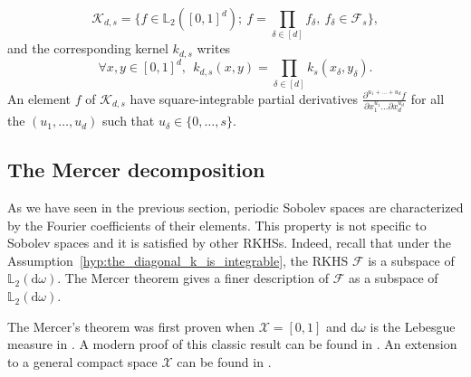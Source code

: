 \documentclass[twoside,11pt]{book}
\numberwithin{theorem}{chapter}
\numberwithin{definition}{chapter}
\numberwithin{proposition}{chapter}
\numberwithin{corollary}{chapter}
\numberwithin{example}{chapter}
\numberwithin{lemma}{chapter}
\numberwithin{assumption}{chapter}
\DeclareMathOperator{\Span}{\mathrm{Span}}
\begin{document}
\begin{equation}
\mathcal{K}_{d,s} = \{ f \in \mathbb{L}_{2}([0,1]^{d}); \: f = \prod\limits_{\delta \in [d]} f_{\delta}, \: f_{\delta} \in \mathcal{F}_{s} \},
\end{equation}
and the corresponding kernel $k_{d,s}$ writes
\begin{equation}
\forall x,y \in [0,1]^{d}, \:\: k_{d,s}(x,y) = \prod\limits_{\delta \in [d]}k_{s}(x_{\delta},y_{\delta}).
\end{equation}
An element $f$ of $\mathcal{K}_{d,s}$ have square-integrable partial derivatives $\displaystyle \frac{\partial^{u_{1}+ \dots + u_{d}}f}{\partial x_{1}^{u_{1}} \dots \partial x_{d}^{u_{d}}} $ for all the $(u_{1}, \dots,u_{d})$ such that $u_{\delta} \in \{0, \dots, s\}$.





%
 


\subsection{The Mercer decomposition}
\label{subsec:mercer}
As we have seen in the previous section, periodic Sobolev spaces are characterized by the Fourier coefficients of their elements. This property is not specific to Sobolev spaces and it is satisfied by other RKHSs. Indeed, recall that under the Assumption~\ref{hyp:the_diagonal_k_is_integrable}, the RKHS $\mathcal{F}$ is a subspace of $\mathbb{L}_{2}(\mathrm{d}\omega)$. The Mercer theorem gives a finer description of $\mathcal{F}$ as a subspace of $\mathbb{L}_{2}(\mathrm{d}\omega)$.



The Mercer's theorem was first proven when $\mathcal{X} = [0,1]$ and $\mathrm{d}\omega$ is the Lebesgue measure in \cite{Mer1909}.
A modern proof of this classic result can be found in \cite{Lax02}. An extension to a general compact space $\mathcal{X}$ can be  found in \cite{CuZh07}. 
\end{document}
